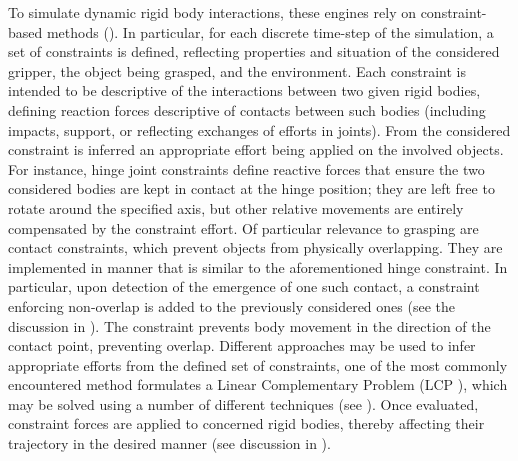 To simulate dynamic rigid body interactions, these engines rely on constraint-based methods (\cite{baraff1993non}). In particular, for each discrete time-step of the simulation, a set of constraints is defined, reflecting properties and situation of the considered gripper, the object being grasped, and the environment. Each constraint is intended to be descriptive of the interactions between two given rigid bodies, defining reaction forces descriptive of contacts between such bodies (including impacts, support, or reflecting exchanges of efforts in joints). From the considered constraint is inferred an appropriate effort being applied on the involved objects. For instance, hinge joint constraints define reactive forces that ensure the two considered bodies are kept in contact at the hinge position; they are left free to rotate around the specified axis, but other relative movements are entirely compensated by the constraint effort. Of particular relevance to grasping are contact constraints, which prevent objects from physically overlapping. They are implemented in manner that is similar to the aforementioned hinge constraint. In particular, upon detection of the emergence of one such contact, a constraint enforcing non-overlap is added to the previously considered ones (see the discussion in \cite{baraff1993non}). The constraint prevents body movement in the direction of the contact point, preventing overlap. Different approaches may be used to infer appropriate efforts from the defined set of constraints, one of the most commonly encountered method formulates a Linear Complementary Problem (LCP \cite{cottle2009}), which may be solved using a number of different techniques (see \cite{anitescu_time_stepping_lcp_solver,lemke_lcp_solver}). Once evaluated, constraint forces are applied to concerned rigid bodies, thereby affecting their trajectory in the desired manner (see discussion in \cite{extending_ode_robots}).


